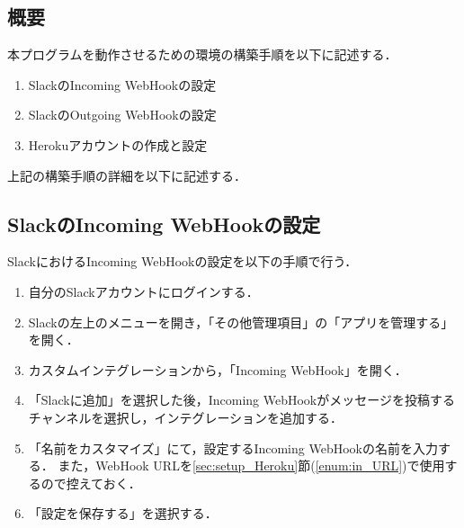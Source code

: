 \documentclass[12pt]{jsarticle}
\begin{document}
\subsection{概要}
本プログラムを動作させるための環境の構築手順を以下に記述する．
\begin{enumerate}
\item SlackのIncoming WebHookの設定
\item SlackのOutgoing WebHookの設定
\item Herokuアカウントの作成と設定
\end{enumerate}

上記の構築手順の詳細を以下に記述する．

\subsection{SlackのIncoming WebHookの設定}\label{sec:Incoming}
SlackにおけるIncoming WebHookの設定を以下の手順で行う．
\begin{enumerate}
\item 自分のSlackアカウントにログインする．
\item Slackの左上のメニューを開き，「その他管理項目」の「アプリを管理する」を開く．
\item カスタムインテグレーションから，「Incoming WebHook」を開く．
\item 「Slackに追加」を選択した後，Incoming WebHookがメッセージを投稿するチャンネルを選択し，インテグレーションを追加する．
\item\label{enum:Heroku_URL} 「名前をカスタマイズ」にて，設定するIncoming WebHookの名前を入力する．
  また，WebHook URLを\ref{sec:setup_Heroku}節(\ref{enum:in_URL})で使用するので控えておく．
\item 「設定を保存する」を選択する．
\end{enumerate}
\end{document}
